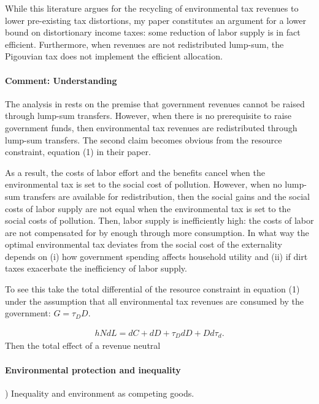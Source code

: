  While this literature argues for the recycling of environmental tax revenues to lower pre-existing tax distortions, my paper constitutes an argument for a lower bound on distortionary income taxes: some reduction of labor supply is in fact efficient. 
Furthermore, when revenues are not redistributed lump-sum, the Pigouvian tax does not implement the efficient allocation. 

\paragraph{Comment: Understanding \cite{LansBovenberg1994EnvironmentalTaxation}}

The analysis in \cite{LansBovenberg1994EnvironmentalTaxation} rests on the premise that government revenues cannot be raised through lump-sum transfers. However, when there is no prerequisite to raise government funds, then environmental tax revenues are redistributed through lump-sum transfers. The second claim becomes obvious from the resource constraint, equation (1) in their paper. 

As a result, the costs of labor effort and the benefits cancel when the environmental tax is set to the social cost of pollution. However, when no lump-sum transfers are available for redistribution, then the social gains and the social costs of labor supply are not equal when the environmental tax is set to the social costs of pollution. Then, labor supply is inefficiently high: the costs of labor are not compensated for by enough through more consumption. In what way the optimal environmental tax deviates from the social cost of the externality depends on (i) how government spending affects household utility and (ii) if dirt taxes exacerbate the inefficiency of labor supply. 

To see this take the total differential of the resource constraint in \cite{LansBovenberg1994EnvironmentalTaxation} equation (1) under the assumption that all environmental tax revenues are consumed by the government: $G=\tau_D D$.

\begin{align}
hNdL = dC+dD+\tau_D dD +D d\tau_d.
\end{align}
 Then the total effect of a revenue neutral 


\paragraph{Environmental protection and inequality}
) Inequality and environment as competing goods.

